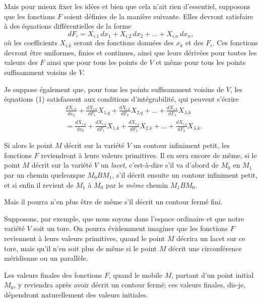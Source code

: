 \documentclass{article}
\begin{document}
Mais pour mieux fixer les idées et bien que cela n'ait rien d'essentiel, supposons que les fonctions $F$ soient définies de la manière suivante. Elles devront satisfaire à des équations différentielles de la forme
\[ dF_{i} = X_{i.1}\,dx_{1} + X_{i.2}\,dx_{2} + \ldots + X_{i.n}\,dx_{n}, \tag{1} \]
où les coefficients $X_{i.k}$ seront des fonctions données des $x_{k}$ et des $F_{i}$. Ces fonctions devront être uniformes, finies et continues, ainsi que leurs dérivées pour toutes les valeurs des $F$ ainsi que pour tous les points de $V$ et même pour tous les points suffisamment voisins de $V$.

Je suppose également que, pour tous les points suffisamment voisins de $V$, les équations (1) satisfassent aux conditions d'intégrabilité, qui
peuvent s'écrire
\[ \begin{aligned} &\frac{dX_{i.k}}{dx_{q}} + \frac{dX_{i.k}}{dF_{1}}X_{1.q} + \frac{dX_{i.k}}{dF_{2}}X_{2.q} + \ldots + \frac{dX_{i.k}}{dF_{\lambda}}X_{\lambda.k}\\ &= \frac{dX_{i.q}}{dx_{k}} + \frac{dX_{i.q}}{dF_{1}}X_{1.k} + \frac{dX_{i.q}}{dF_{2}}X_{2.k} + \ldots + \frac{dX_{i.q}}{dF_{k}}X_{\lambda.k}. \end{aligned} \]

Si alors le point $M$ décrit sur la variété $V$ un contour infiniment petit, les fonctions $F$ reviendront à leurs valeurs primitives. Il en sera encore de même, si le point $M$ décrit sur la variété $V$ un \emph{lacet}, c'est-à-dire s'il va d'abord de $M_{0}$ en $M_{1}$ par un chemin quelconque $M_{0}BM_{1}$, s'il décrit ensuite un contour infiniment petit, et si enfin il revient de $M_{1}$ à $M_{0}$ par le \emph{même} chemin $M_{1}BM_{0}$.

Mais il pourra n'en plus être de même s'il décrit un contour fermé fini.

Supposons, par exemple, que nous soyons dans l'espace ordinaire et que notre variété $V$ soit un tore. On pourra évidemment imaginer que les fonctions $F$ reviennent à leurs valeurs primitives, quand le point $M$ décrira un lacet sur ce tore, mais qu'il n'en soit plus de même si le point $M$ décrit une circonférence méridienne ou un parallèle.

Les valeurs finales des fonctions $F$, quand le mobile $M$, partant d'un point initial $M_{0}$, y reviendra après avoir décrit un contour fermé; ces valeurs finales, dis-je, dépendront naturellement des valeurs initiales.
\end{document}
